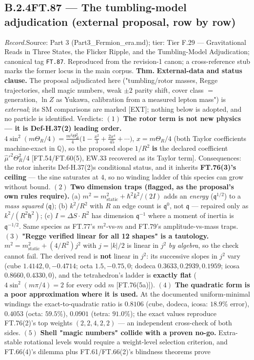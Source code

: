 \documentclass[11pt,openany]{report}
\theoremstyle{canonplain}
\theoremstyle{canondef}
\begin{document}
\subsection*{\texorpdfstring{B.2.4\quad FT.87 — The tumbling-model adjudication (external proposal, row by row)}{FT.87 B.2.4}}
\label{tag:FT-87}
{\small \textit{Record.}\quad Source: Part 3 (Part3\_Fermion\_era.md); tier: Tier F.29 — Gravitational Reads in Three States, the Flicker Ripple, and the Tumbling-Model Adjudication; canonical tag \texttt{FT.87}. Reproduced from the revision-1 canon; a cross-reference stub marks the former locus in the main corpus.}
\medskip
\textbf{Thm.} \textbf{External-data and status clause.} The proposal adjudicated here ("tumbling/rotor masses, Regge trajectories, shell magic numbers, weak $\pm2$ parity shift, cover class $=$ generation, $\ln Z$ as Yukawa, calibration from a measured lepton mass") is \textit{external}; its SM comparisons are marked [EXT]; nothing below is adopted, and no particle is identified. Verdicts: $(1)$ \textbf{The rotor term is not new physics — it is Def-H.37(2) leading order.} $4\sin^2(m\Theta_R/4)=\tfrac{m^2\Theta_R^2}{4}\bigl(1-\tfrac{x^2}{3}+\tfrac{2x^4}{45}+\cdots\bigr)$, $x=m\Theta_R/4$ (both Taylor coefficients machine-exact in $\mathbb Q$), so the proposed slope $1/R^2$ \textbf{is} the declared coefficient $\hat\mu'^2\Theta_R^2/4$ [FT.54/FT.60(5), EW.33 recovered as its Taylor term]. Consequences: the rotor inherits Def-H.37(2)s conditional status, and it inherits \textbf{FT.76(3)'s ceiling} — the sine saturates at $4$, so no winding ladder of this species can grow without bound. $(2)$ \textbf{Two dimension traps (flagged, as the proposal's own rules require).} (a) $m^2=m^2_{\mathrm{static}}+\hbar^2k^2/(2I)$ adds an \textit{energy} ($\mathfrak q^{1/2}$) to a \textit{mass squared} ($\mathfrak q$); (b) $k^2/R^2$ with $R$ an edge count is $\mathfrak q^0$, not $\mathfrak q$ — repaired only as $k^2/(R^2\mathfrak h^2)$; (c) $I=\Delta S\cdot R^2$ has dimension $\mathfrak q^{-1}$ where a moment of inertia is $\mathfrak q^{-1/2}$. Same species as FT.77's $m^2$-vs-$m$ and FT.79's amplitude-vs-mass traps. $(3)$ \textbf{"Regge verified linear for all 12 shapes" is a tautology.} $m^2=m^2_{\mathrm{static}}+(4/R^2)j^2$ with $j=|k|/2$ is linear in $j^2$ \textit{by algebra}, so the check cannot fail. The derived read is \textbf{not} linear in $j^2$: its successive slopes in $j^2$ vary (cube $1.4142,0,-0.4714$; octa $1.5,-0.75,0$; dodeca $0.3633,0.2939,0.1959$; icosa $0.8660,0.4330,0$), and the tetrahedron's ladder is \textbf{exactly flat} ($4\sin^2(m\pi/4)=2$ for every odd $m$ [FT.76(5a)]). $(4)$ \textbf{The quadratic form is a poor approximation where it is used.} At the documented uniform-minimal windings the exact-to-quadratic ratio is $0.8106$ (cube, dodeca, icosa: $18.9\%$ error), $0.4053$ (octa: $59.5\%$), $0.0901$ (tetra: $91.0\%$); the exact values reproduce FT.76(2)'s top weights $(2,2,4,2,2)$ — an independent cross-check of both sides. $(5)$ \textbf{Shell "magic numbers" collide with a proven no-go.} Extra-stable rotational levels would require a weight-level selection criterion, and FT.66(4)'s dilemma plus FT.61/FT.66(2)'s blindness theorems prove 
\end{document}
